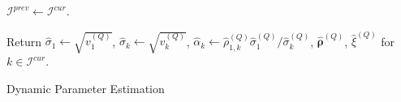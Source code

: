 \begin{algorithm}[!ht]
{    %
    
        


    $\mathcal{I}^{prev} \gets \mathcal{I}^{cur}$.
    }


    

    
    
    
    
    
    
Return $\widehat{\sigma}_1 \gets \sqrt{v_1^{(Q)}}$, $\widehat{\sigma}_k \gets \sqrt{v_k^{(Q)}}$, $\widehat{\alpha}_k \gets \widehat{\rho}_{1,k}^{(Q)} \widehat{\sigma}_1^{(Q)} / \widehat{\sigma}_k^{(Q)}$, $\widehat{\boldsymbol{\rho}}^{(Q)}$, $\widehat{\xi}^{(Q)}$ for $k \in \mathcal{I}^{cur}$.
\caption{Dynamic Parameter Estimation}
\end{algorithm}
\ULforem
%



